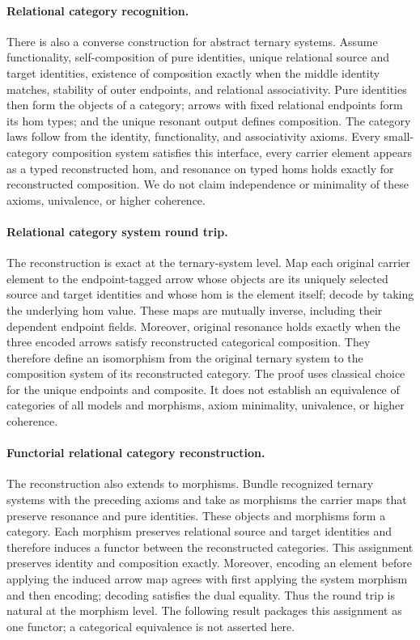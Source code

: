 \documentclass[11pt]{article}
\theoremstyle{definition}
\begin{document}
\paragraph{Relational category recognition.}
There is also a converse construction for abstract ternary systems.  Assume
functionality, self-composition of pure identities, unique relational source
and target identities, existence of composition exactly when the middle
identity matches, stability of outer endpoints, and relational associativity.  Pure
identities then form the objects of a category; arrows with fixed relational
endpoints form its hom types; and the unique resonant output defines
composition.  The category laws follow from the identity, functionality, and
associativity axioms.  Every small-category composition system satisfies this
interface, every carrier element appears as a typed reconstructed hom, and
resonance on typed homs holds exactly for reconstructed composition.  We do
not claim independence or minimality of these axioms, univalence, or higher
coherence.

\paragraph{Relational category system round trip.}
The reconstruction is exact at the ternary-system level.  Map each original
carrier element to the endpoint-tagged arrow whose objects are its uniquely
selected source and target identities and whose hom is the element itself;
decode by taking the underlying hom value.  These maps are mutually inverse,
including their dependent endpoint fields.  Moreover, original resonance
holds exactly when the three encoded arrows satisfy reconstructed categorical
composition.  They therefore define an isomorphism from the original ternary
system to the composition system of its reconstructed category.  The proof
uses classical choice for the unique endpoints and composite.  It does not
establish an equivalence of categories of all models and morphisms, axiom
minimality, univalence, or higher coherence.

\paragraph{Functorial relational category reconstruction.}
The reconstruction also extends to morphisms.  Bundle recognized ternary
systems with the preceding axioms and take as morphisms the carrier maps that
preserve resonance and pure identities.  These objects and morphisms form a
category.  Each morphism preserves relational source and target identities and
therefore induces a functor between the reconstructed categories.  This
assignment preserves identity and composition exactly.  Moreover, encoding an
element before applying the induced arrow map agrees with first applying the
system morphism and then encoding; decoding satisfies the dual equality.  Thus
the round trip is natural at the morphism level.  The following result packages
this assignment as one functor; a categorical equivalence is not asserted here.
\end{document}
